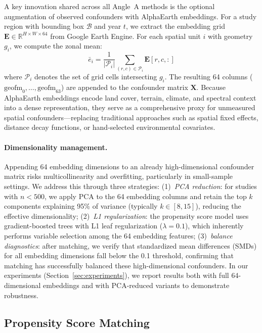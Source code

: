 \documentclass{article}
\begin{document}
A key innovation shared across all Angle~A methods is the optional augmentation of observed confounders with AlphaEarth embeddings. For a study region with bounding box $\mathcal{B}$ and year $t$, we extract the embedding grid $\mathbf{E} \in \mathbb{R}^{H \times W \times 64}$ from Google Earth Engine. For each spatial unit $i$ with geometry $g_i$, we compute the zonal mean:
\begin{equation}
\bar{e}_i = \frac{1}{|\mathcal{P}_i|} \sum_{(r,c) \in \mathcal{P}_i} \mathbf{E}[r, c, :]
\label{eq:zonal_mean}
\end{equation}
where $\mathcal{P}_i$ denotes the set of grid cells intersecting $g_i$. The resulting 64 columns ($\text{geofm}_0, \ldots, \text{geofm}_{63}$) are appended to the confounder matrix $\mathbf{X}$. Because AlphaEarth embeddings encode land cover, terrain, climate, and spectral context into a dense representation, they serve as a comprehensive proxy for unmeasured spatial confounders---replacing traditional approaches such as spatial fixed effects, distance decay functions, or hand-selected environmental covariates.

\paragraph{Dimensionality management.} Appending 64 embedding dimensions to an already high-dimensional confounder matrix risks multicollinearity and overfitting, particularly in small-sample settings. We address this through three strategies: (1)~\textit{PCA reduction}: for studies with $n < 500$, we apply PCA to the 64 embedding columns and retain the top $k$ components explaining 95\% of variance (typically $k \in [8, 15]$), reducing the effective dimensionality; (2)~\textit{L1 regularization}: the propensity score model uses gradient-boosted trees with L1 leaf regularization ($\lambda = 0.1$), which inherently performs variable selection among the 64 embedding features; (3)~\textit{balance diagnostics}: after matching, we verify that standardized mean differences (SMDs) for all embedding dimensions fall below the 0.1 threshold, confirming that matching has successfully balanced these high-dimensional confounders. In our experiments (Section~\ref{sec:experiments}), we report results both with full 64-dimensional embeddings and with PCA-reduced variants to demonstrate robustness.

\subsection{Propensity Score Matching}
\end{document}
